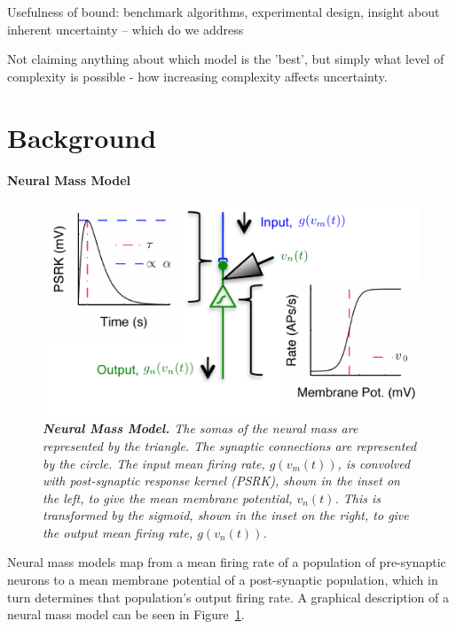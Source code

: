 \documentclass{article}
\begin{document}
Usefulness of bound: benchmark algorithms, experimental design, insight about inherent uncertainty -- which do we address


Not claiming anything about which model is the 'best', but simply what level of complexity is possible - how increasing complexity affects uncertainty.
\section{Background}
\label{sec:background}


\paragraph{Neural Mass Model}
\begin{figure}[ht]
  \begin{center}
    \includegraphics{./figures/pdf/SingleMass_plos.pdf}
  \end{center}
  \caption{\emph{\textbf{Neural Mass Model.} The somas of the neural mass are represented by the triangle. The synaptic connections are represented by the circle. The input mean firing rate, $g(v_m(t))$, is convolved with post-synaptic response kernel (PSRK), shown in the inset on the left, to give the mean membrane potential, $v_n(t)$. This is transformed by the sigmoid, shown in the inset on the right, to give the output mean firing rate, $g(v_n(t))$.}}
  \label{fig:SingleNeuralMass}
\end{figure}
Neural mass models map from a mean firing rate of a population of pre-synaptic neurons to a mean membrane potential of a post-synaptic population, which in turn determines that population's output firing rate. A graphical description of a neural mass model can be seen in Figure~\ref{fig:SingleNeuralMass}. 
\end{document}
